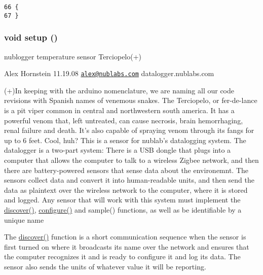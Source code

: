 \begin{Code}\begin{verbatim}66 {
67 }
\end{verbatim}
\end{Code}


\hypertarget{temperature__sensor___terciopelo_8pde_4fc01d736fe50cf5b977f755b675f11d}{
\subsubsection[{setup}]{\setlength{\rightskip}{0pt plus 5cm}void setup ()}}
\label{temperature__sensor___terciopelo_8pde_4fc01d736fe50cf5b977f755b675f11d}


nublogger temperature sensor Terciopelo(+)

Alex Hornstein 11.19.08 \href{mailto:alex@nublabs.com}{\tt alex@nublabs.com} datalogger.nublabs.com

(+)In keeping with the arduino nomenclature, we are naming all our code revisions with Spanish names of venemous snakes. The Terciopelo, or fer-de-lance is a pit viper common in central and northwestern south america. It has a powerful venom that, left untreated, can cause necrosis, brain hemorrhaging, renal failure and death. It's also capable of spraying venom through its fangs for up to 6 feet. Cool, huh? This is a sensor for nublab's datalogging system. The datalogger is a two-part system: There is a USB dongle that plugs into a computer that allows the computer to talk to a wireless Zigbee network, and then there are battery-powered sensors that sense data about the environemnt. The sensors collect data and convert it into human-readable units, and then send the data as plaintext over the wireless network to the computer, where it is stored and logged. Any sensor that will work with this system must implement the \hyperlink{nublogger_8h_3fdb2350c3f98c0de0f0ae3c831a8b14}{discover()}, \hyperlink{nublogger_8h_e369b3765489ee8bd0ea791c1843630f}{configure()} and sample() functions, as well as be identifiable by a unique name

The \hyperlink{nublogger_8h_3fdb2350c3f98c0de0f0ae3c831a8b14}{discover()} function is a short communication sequence when the sensor is first turned on where it broadcasts its name over the network and ensures that the computer recognizes it and is ready to configure it and log its data. The sensor also sends the units of whatever value it will be reporting.

